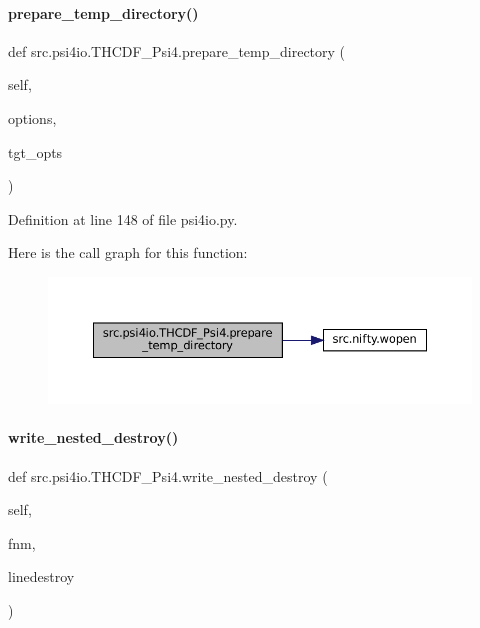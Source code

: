 \paragraph{\texorpdfstring{prepare\+\_\+temp\+\_\+directory()}{prepare\_temp\_directory()}}
{\footnotesize\ttfamily def src.\+psi4io.\+T\+H\+C\+D\+F\+\_\+\+Psi4.\+prepare\+\_\+temp\+\_\+directory (\begin{DoxyParamCaption}\item[{}]{self,  }\item[{}]{options,  }\item[{}]{tgt\+\_\+opts }\end{DoxyParamCaption})}



Definition at line 148 of file psi4io.\+py.

Here is the call graph for this function\+:
\nopagebreak
\begin{figure}[H]
\begin{center}
\leavevmode
\includegraphics[width=350pt]{classsrc_1_1psi4io_1_1THCDF__Psi4_a3201f4428d75dd17f9fed6e726117da6_cgraph}
\end{center}
\end{figure}
\mbox{\label{classsrc_1_1psi4io_1_1THCDF__Psi4_a4fb94880d038f875460abd67e18bdf43}} 
\paragraph{\texorpdfstring{write\+\_\+nested\+\_\+destroy()}{write\_nested\_destroy()}}
{\footnotesize\ttfamily def src.\+psi4io.\+T\+H\+C\+D\+F\+\_\+\+Psi4.\+write\+\_\+nested\+\_\+destroy (\begin{DoxyParamCaption}\item[{}]{self,  }\item[{}]{fnm,  }\item[{}]{linedestroy }\end{DoxyParamCaption})}



